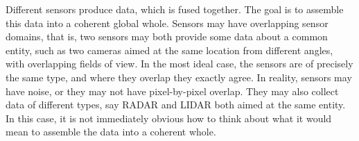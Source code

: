 Different sensors produce data, which is fused together. The goal is to assemble this data into a coherent global whole. Sensors may have overlapping sensor domains, that is, two sensors may both provide some data about a common entity, such as two cameras aimed at the same location from different angles, with overlapping fields of view. In the most ideal case, the sensors are of precisely the same type, and where they overlap they exactly agree. In reality, sensors may have noise, or they may not have pixel-by-pixel overlap. They may also collect data of different types, say RADAR and LIDAR both aimed at the same entity. In this case, it is not immediately obvious how to think about what it would mean to assemble the data into a coherent whole.

